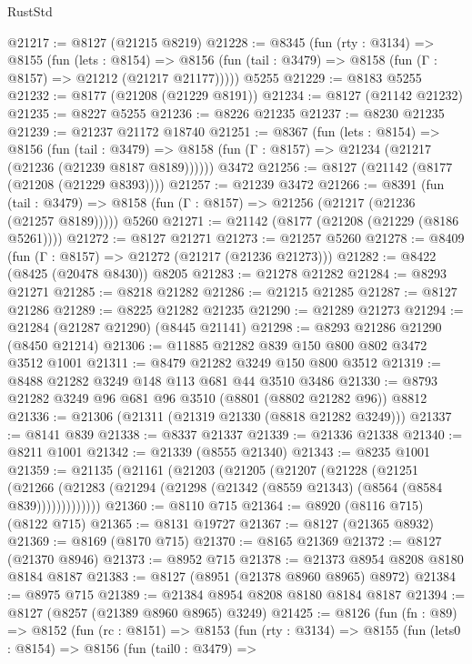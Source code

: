 \begin{lexlean}{RustStd}
\begin{coremodule}
@21217 := @8127 (@21215 @8219)
@21228 := @8345
    (fun (rty : @3134) =>
    @8155
      (fun (lets : @8154) =>
      @8156 (fun (tail : @3479) => @8158 (fun (Γ : @8157) => @21212 (@21217 @21177)))))
    @5255
@21229 := @8183 @5255
@21232 := @8177 (@21208 (@21229 @8191))
@21234 := @8127 (@21142 @21232)
@21235 := @8227 @5255
@21236 := @8226 @21235
@21237 := @8230 @21235
@21239 := @21237 @21172 @18740
@21251 := @8367
    (fun (lets : @8154) =>
    @8156
      (fun (tail : @3479) =>
      @8158 (fun (Γ : @8157) => @21234 (@21217 (@21236 (@21239 @8187 @8189))))))
    @3472
@21256 := @8127 (@21142 (@8177 (@21208 (@21229 @8393))))
@21257 := @21239 @3472
@21266 := @8391
    (fun (tail : @3479) => @8158 (fun (Γ : @8157) => @21256 (@21217 (@21236 (@21257 @8189)))))
    @5260
@21271 := @21142 (@8177 (@21208 (@21229 (@8186 @5261))))
@21272 := @8127 @21271
@21273 := @21257 @5260
@21278 := @8409 (fun (Γ : @8157) => @21272 (@21217 (@21236 @21273)))
@21282 := @8422 (@8425 (@20478 @8430)) @8205
@21283 := @21278 @21282
@21284 := @8293 @21271
@21285 := @8218 @21282
@21286 := @21215 @21285
@21287 := @8127 @21286
@21289 := @8225 @21282 @21235
@21290 := @21289 @21273
@21294 := @21284 (@21287 @21290) (@8445 @21141)
@21298 := @8293 @21286 @21290 (@8450 @21214)
@21306 := @11885 @21282 @839 @150 @800 @802 @3472 @3512 @1001
@21311 := @8479 @21282 @3249 @150 @800 @3512
@21319 := @8488 @21282 @3249 @148 @113 @681 @44 @3510 @3486
@21330 := @8793 @21282 @3249 @96 @681 @96 @3510 (@8801 (@8802 @21282 @96)) @8812
@21336 := @21306 (@21311 (@21319 @21330 (@8818 @21282 @3249)))
@21337 := @8141 @839
@21338 := @8337 @21337
@21339 := @21336 @21338
@21340 := @8211 @1001
@21342 := @21339 (@8555 @21340)
@21343 := @8235 @1001
@21359 := @21135
    (@21161
      (@21203
        (@21205
          (@21207
            (@21228
              (@21251
                (@21266
                  (@21283 (@21294 (@21298 (@21342 (@8559 @21343) (@8564 (@8584 @839)))))))))))))
@21360 := @8110 @715
@21364 := @8920 (@8116 @715) (@8122 @715)
@21365 := @8131 @19727
@21367 := @8127 (@21365 @8932)
@21369 := @8169 (@8170 @715)
@21370 := @8165 @21369
@21372 := @8127 (@21370 @8946)
@21373 := @8952 @715
@21378 := @21373 @8954 @8208 @8180 @8184 @8187
@21383 := @8127 (@8951 (@21378 @8960 @8965) @8972)
@21384 := @8975 @715
@21389 := @21384 @8954 @8208 @8180 @8184 @8187
@21394 := @8127 (@8257 (@21389 @8960 @8965) @3249)
@21425 := @8126
    (fun (fn : @89) =>
    @8152
      (fun (rc : @8151) =>
      @8153
        (fun (rty : @3134) =>
        @8155
          (fun (lets0 : @8154) =>
          @8156
            (fun (tail0 : @3479) =>

\end{coremodule}
\end{lexlean}
